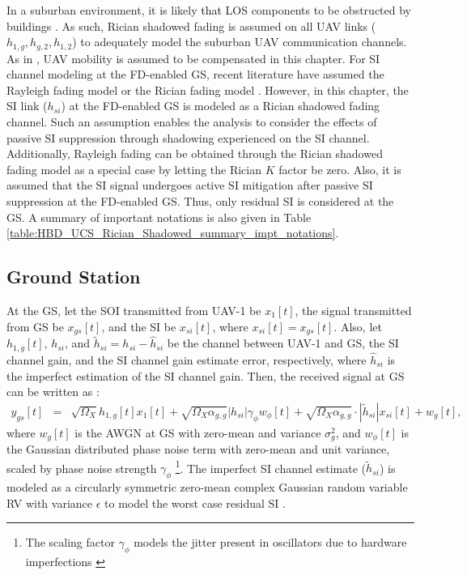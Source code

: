 In a suburban environment, it is likely \textcolor{black}{that} LOS components to be obstructed by buildings \cite{matolak2015unmannedAircraft,matolak2012air,al2014optimal}. As such, Rician shadowed fading \cite{chun2017comprehensive} is assumed on all UAV links ($h_{1,g}, h_{g,2}, h_{1,2}$) to adequately model the suburban UAV communication channels. As in \cite{tan2018joint}, UAV mobility is assumed to be compensated in this chapter. For SI channel modeling at the FD-enabled GS, recent literature have assumed the Rayleigh fading model \cite{mohammadi2015full,yue2018exploiting,yao2018x} or the Rician fading model \cite{ahmed2015all}. However, in this chapter, the SI link ($h_{si}$) at the FD-enabled GS is modeled as a Rician shadowed fading channel. Such an assumption enables the analysis to consider the effects of passive SI suppression through shadowing experienced on the SI channel. Additionally, Rayleigh fading can be obtained through the Rician shadowed fading model as a special case by letting the Rician $K$ factor be zero. Also, it is assumed that the SI signal undergoes active SI mitigation after passive SI suppression at the FD-enabled GS. Thus, only residual SI is considered at the GS. A summary of important notations is also given in Table \ref{table:HBD_UCS_Rician_Shadowed_summary_impt_notations}.


\subsection{Ground Station}
At the GS, let the SOI transmitted from UAV-1 be $x_1[t]$, the signal transmitted from GS be $x_{gs}[t]$, and the SI be $x_{si}[t]$, where $x_{si}[t]=x_{gs}[t]$. Also, let $h_{1,g}[t]$, $h_{si}$, and $\widetilde{h}_{si}=h_{si}-\widehat{h}_{si}$ be the channel between UAV-1 and GS, the SI channel gain, and the SI channel gain estimate error, respectively, where $\widehat{h}_{si}$ is the imperfect estimation of the SI channel gain. Then, the received signal at GS can be written as \cite{sahai2013impact}:
\begin{eqnarray} \label{HBD_UCS_Rician_Shadowed_y_gs}
y_{gs}[t] & = & \sqrt{\Omega_{X}}h_{1,g}[t]x_{1}[t] + \sqrt{\Omega_X\alpha_{g,g}}|h_{si}|\gamma_{\phi}w_{\phi}[t] + \sqrt{\Omega_X\alpha_{g,g}} \cdot |\widetilde{h}_{si}|x_{si}[t] + w_{g}[t], 
\end{eqnarray}
where $w_{g}[t]$ is the AWGN at GS with zero-mean and variance $\sigma_g^2$, and $w_{\phi}[t]$ is the Gaussian distributed phase noise term with zero-mean and unit variance, scaled by phase noise strength $\gamma_{\phi}$ \cite{sahai2013impact}\footnote{The scaling factor $\gamma_{\phi}$ models the jitter present in oscillators due to hardware imperfections \cite{sahai2013impact}}. The imperfect SI channel estimate ($\widetilde{h}_{si}$) is modeled as a circularly symmetric zero-mean complex Gaussian random variable RV with variance $\epsilon$ to model the worst case residual SI \cite{zlatanov2017capacity}.

